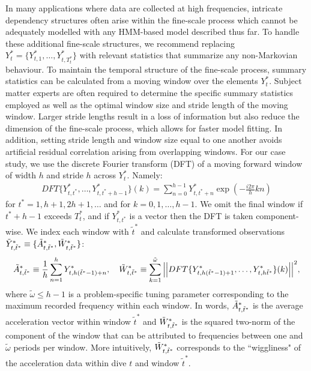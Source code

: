 In many applications where data are collected at high frequencies, intricate dependency structures often arise within the fine-scale process which cannot be adequately modelled with any HMM-based model described thus far. 
To handle these additional fine-scale structures, we recommend replacing $Y_t^* = \{Y^*_{t,1},\ldots,Y^*_{t,T^*_t}\}$ with relevant statistics that summarize any non-Markovian behaviour. To maintain the temporal structure of the fine-scale process, summary statistics can be calculated from a moving window over the elements $Y_t^*$. Subject matter experts are often required to determine the specific summary statistics employed as well as the optimal window size and stride length of the moving window. Larger stride lengths result in a loss of information but also reduce the dimension of the fine-scale process, which allows for faster model fitting. In addition, setting stride length and window size equal to one another avoids artificial residual correlation arising from overlapping windows. For our case study, we use the discrete Fourier transform (DFT) of a moving forward window of width $h$ and stride $h$ across $Y^*_t$. Namely:
%
\begin{align*}
    DFT\{Y^*_{t,t^*},\ldots, Y^*_{t,t^*+h-1}\}(k) = \sum_{n=0}^{h-1} Y^*_{t,t^*+n}\exp\left(-\frac{i 2\pi}{h} kn \right)
\end{align*}
%
for $t^* = 1,h+1,2h+1,\ldots$ and for $k = 0, 1, \ldots, h-1$. We omit the final window if $t^*+h-1$ exceeds $T^*_t$, and if $Y^*_{t,t^*}$ is a vector then the DFT is taken component-wise. We index each window with $\tilde{t}^*$ and calculate transformed observations $\tilde{Y}^*_{t,\tilde{t}^*} \equiv \{\tilde{A}^*_{t,\tilde{t}^*},\tilde{W}^*_{t,\tilde{t}^*}\}$:
%
\begin{equation}
    \label{eqn:z}
    \Zone_{t,\tilde{t}^*} \equiv \frac{1}{h}\sum_{n=1}^{h}Y^*_{t,h(\tilde{t}^*-1)+n}, \quad \Ztwo_{t,\tilde{t}^*} \equiv \sum_{k=1}^{\tilde{\omega}}\Big|\Big|DFT\{Y^*_{t,h(\tilde{t}^*-1)+1},\ldots, Y^*_{t,h\tilde{t}^*}\}(k)\Big|\Big|^2,
\end{equation}
%
where $\tilde{\omega} \leq h-1$ is a problem-specific tuning parameter corresponding to the maximum recorded frequency within each window. In words, $\tilde{A}^*_{t,\tilde{t}^*}$ is the average acceleration vector within window $\tilde{t}^*$ and $\tilde{W}^*_{t,\tilde{t}^*}$ is the squared two-norm of the component of the window that can be attributed to frequencies between one and $\tilde{\omega}$ periods per window. %
More intuitively, $\tilde{W}^*_{t,\tilde{t}^*}$ corresponds to the ``wiggliness" of the acceleration data within dive $t$ and window $\tilde{t}^*$.

